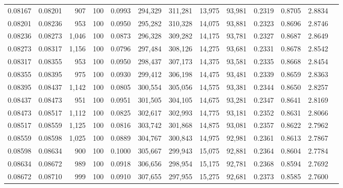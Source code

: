 \begin{tabular}{rrrrrrrrrrrrr}
0.08167 & 0.08201 &   907 & 100 &                                     0.0993 & 294,329 & 311,281 &  13,975 &  93,981 & 0.2319 & 0.8705 & 2.8834 \\
0.08201 & 0.08236 &   953 & 100 &                                     0.0950 & 295,282 & 310,328 &  14,075 &  93,881 & 0.2323 & 0.8696 & 2.8746 \\
0.08236 & 0.08273 & 1,046 & 100 &                                     0.0873 & 296,328 & 309,282 &  14,175 &  93,781 & 0.2327 & 0.8687 & 2.8649 \\
0.08273 & 0.08317 & 1,156 & 100 &                                     0.0796 & 297,484 & 308,126 &  14,275 &  93,681 & 0.2331 & 0.8678 & 2.8542 \\
0.08317 & 0.08355 &   953 & 100 &                                     0.0950 & 298,437 & 307,173 &  14,375 &  93,581 & 0.2335 & 0.8668 & 2.8454 \\
0.08355 & 0.08395 &   975 & 100 &                                     0.0930 & 299,412 & 306,198 &  14,475 &  93,481 & 0.2339 & 0.8659 & 2.8363 \\
0.08395 & 0.08437 & 1,142 & 100 &                                     0.0805 & 300,554 & 305,056 &  14,575 &  93,381 & 0.2344 & 0.8650 & 2.8257 \\
0.08437 & 0.08473 &   951 & 100 &                                     0.0951 & 301,505 & 304,105 &  14,675 &  93,281 & 0.2347 & 0.8641 & 2.8169 \\
0.08473 & 0.08517 & 1,112 & 100 &                                     0.0825 & 302,617 & 302,993 &  14,775 &  93,181 & 0.2352 & 0.8631 & 2.8066 \\
0.08517 & 0.08559 & 1,125 & 100 &                                     0.0816 & 303,742 & 301,868 &  14,875 &  93,081 & 0.2357 & 0.8622 & 2.7962 \\
0.08559 & 0.08598 & 1,025 & 100 &                                     0.0889 & 304,767 & 300,843 &  14,975 &  92,981 & 0.2361 & 0.8613 & 2.7867 \\
0.08598 & 0.08634 &   900 & 100 &                                     0.1000 & 305,667 & 299,943 &  15,075 &  92,881 & 0.2364 & 0.8604 & 2.7784 \\
0.08634 & 0.08672 &   989 & 100 &                                     0.0918 & 306,656 & 298,954 &  15,175 &  92,781 & 0.2368 & 0.8594 & 2.7692 \\
0.08672 & 0.08710 &   999 & 100 &                                     0.0910 & 307,655 & 297,955 &  15,275 &  92,681 & 0.2373 & 0.8585 & 2.7600 \\

\end{tabular}
